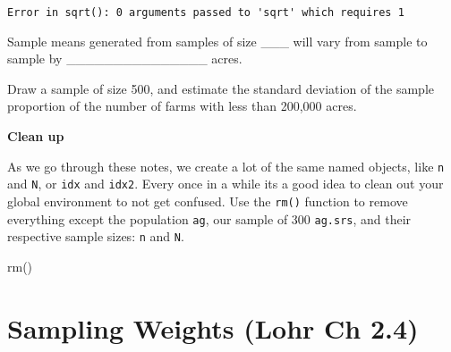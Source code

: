 \documentclass[
  letterpaper,
  DIV=11,
  numbers=noendperiod]{scrartcl}
\newenvironment{Shaded}{}{}
\newcommand{\FunctionTok}[1]{\textcolor[rgb]{0.44,0.26,0.76}{#1}}
\newcommand{\NormalTok}[1]{\textcolor[rgb]{0.14,0.16,0.18}{#1}}
\begin{document}
\begin{verbatim}
Error in sqrt(): 0 arguments passed to 'sqrt' which requires 1
\end{verbatim}

Sample means generated from samples of size \_\_\_ will vary from sample
to sample by \_\_\_\_\_\_\_\_\_\_\_\_\_\_\_ acres.

\begin{tcolorbox}[enhanced jigsaw, toptitle=1mm, breakable, colframe=quarto-callout-warning-color-frame, colbacktitle=quarto-callout-warning-color!10!white, left=2mm, titlerule=0mm, bottomtitle=1mm, title={You try it}, bottomrule=.15mm, rightrule=.15mm, arc=.35mm, toprule=.15mm, colback=white, opacityback=0, leftrule=.75mm, coltitle=black, opacitybacktitle=0.6]

Draw a sample of size 500, and estimate the standard deviation of the
sample proportion of the number of farms with less than 200,000 acres.

\end{tcolorbox}

\begin{tcolorbox}[enhanced jigsaw, breakable, colframe=quarto-callout-important-color-frame, rightrule=.15mm, arc=.35mm, bottomrule=.15mm, colback=white, opacityback=0, leftrule=.75mm, toprule=.15mm, left=2mm]

\textbf{Clean up}\vspace{2mm}

As we go through these notes, we create a lot of the same named objects,
like \texttt{n} and \texttt{N}, or \texttt{idx} and \texttt{idx2}. Every
once in a while its a good idea to clean out your global environment to
not get confused. Use the \texttt{rm()} function to remove everything
except the population \texttt{ag}, our sample of 300 \texttt{ag.srs},
and their respective sample sizes: \texttt{n} and \texttt{N}.

\begin{Shaded}
\begin{Highlighting}[]
\FunctionTok{rm}\NormalTok{()}
\end{Highlighting}
\end{Shaded}

\end{tcolorbox}

\hypertarget{sampling-weights-lohr-ch-2.4}{%
\section{Sampling Weights (Lohr Ch
2.4)}\label{sampling-weights-lohr-ch-2.4}}
\end{document}
